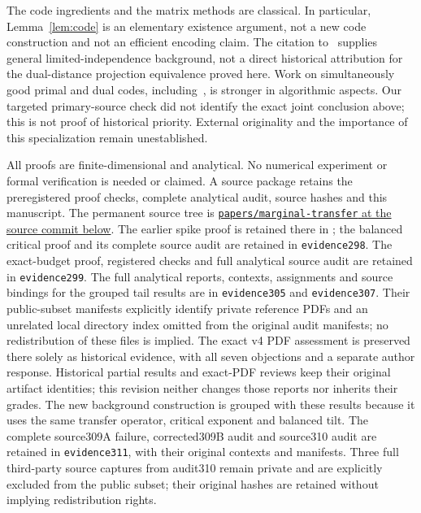 \documentclass[11pt]{article}
\providecommand{\SourceCommit}{SOURCE-NOT-BUILT}
\begin{document}
The code ingredients and the matrix methods are classical. In particular,
Lemma~\ref{lem:code} is an elementary existence argument, not a new code
construction and not an efficient encoding claim. The citation to~\cite{AGM} supplies general limited-independence background, not a direct historical attribution for the dual-distance projection equivalence proved here. Work on simultaneously
good primal and dual codes, including~\cite{BrehmResch}, is stronger in
algorithmic aspects. Our targeted primary-source check did not identify
the exact joint conclusion above; this is not proof of historical priority.
External originality and the importance of this specialization remain
unestablished.

All proofs are finite-dimensional and analytical. No numerical experiment
or formal verification is needed or claimed. A source package retains the
preregistered proof checks, complete analytical audit, source hashes and
this manuscript. The permanent source tree is
\href{https://github.com/lluiseriksson/THE-ERIKSSON-PROGRAMME/tree/\SourceCommit/papers/marginal-transfer}{\texttt{papers/marginal-transfer} at the source commit below}.
The earlier spike proof is retained there in
; the balanced critical proof and
its complete source audit are retained in \texttt{evidence298}.
The exact-budget proof, registered checks and full analytical source
audit are retained in \texttt{evidence299}. The full analytical reports,
contexts, assignments and source bindings for the grouped tail results are
in \texttt{evidence305} and \texttt{evidence307}. Their public-subset manifests explicitly identify
private reference PDFs and an unrelated local directory index omitted from
the original audit manifests; no redistribution of these files is implied.
The exact v4 PDF assessment is preserved there solely as historical evidence,
with all seven objections and a separate author response. Historical partial results
and exact-PDF reviews keep their original artifact identities; this
revision neither changes those reports nor inherits their grades.
The new background construction is grouped with these results because it
uses the same transfer operator, critical exponent and balanced tilt.
The complete source309A failure, corrected309B audit and source310 audit
are retained in \texttt{evidence311}, with their original contexts and
manifests. Three full third-party source captures from audit310 remain
private and are explicitly excluded from the public subset; their
original hashes are retained without implying redistribution rights.
\end{document}
